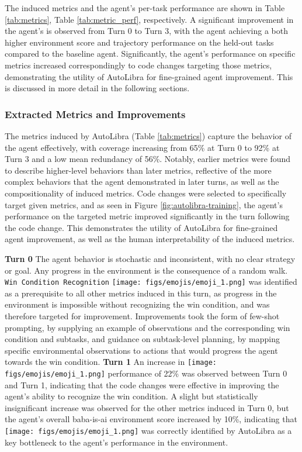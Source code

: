 The induced metrics and the agent's per-task performance are shown in Table \ref{tab:metrics}, Table \ref{tab:metric_perf}, respectively. A significant improvement in the agent's is observed from Turn 0 to Turn 3, with the agent achieving a both higher environment score and trajectory performance on the held-out tasks compared to the baseline agent. Significantly, the agent's performance on specific metrics increased correspondingly to code changes targeting those metrics, demonstrating the utility of AutoLibra for fine-grained agent improvement. This is discussed in more detail in the following sections.

\subsubsection{Extracted Metrics and Improvements}
The metrics induced by AutoLibra (Table \ref{tab:metrics}) capture the behavior of the agent effectively, with coverage increasing from 65\% at Turn 0 to 92\% at Turn 3 and a low mean redundancy of 56\%. Notably, earlier metrics were found to describe higher-level behaviors than later metrics, reflective of the more complex behaviors that the agent demonstrated in later turns, as well as the compositionality of induced metrics. Code changes were selected to specifically target given metrics, and as seen in Figure \ref{fig:autolibra-training}, the agent's performance on the targeted metric improved significantly in the turn following the code change. This demonstrates the utility of AutoLibra for fine-grained agent improvement, as well as the human interpretability of the induced metrics.

\textbf{Turn 0}
The agent behavior is stochastic and inconsistent, with no clear strategy or goal. Any progress in the environment is the consequence of a random walk. 
\texttt{Win Condition Recognition} \texttt{[image: figs/emojis/emoji\_1.png]} was identified as a prerequisite to all other metrics induced in this turn, as progress in the environment is impossible without recognizing the win condition, and was therefore targeted for improvement. Improvements took the form of few-shot prompting, by supplying an example of observations and the corresponding win condition and subtasks, and guidance on subtask-level planning, by mapping specific environmental observations to actions that would progress the agent towards the win condition.
\newline
\textbf{Turn 1}
An increase in \texttt{[image: figs/emojis/emoji\_1.png]} performance of 22\% was observed between Turn 0 and Turn 1, indicating that the code changes were effective in improving the agent's ability to recognize the win condition. A slight but statistically insignificant increase was observed for the other metrics induced in Turn 0, but the agent's overall baba-is-ai environment score increased by 10\%, indicating that \texttt{[image: figs/emojis/emoji\_1.png]} was correctly identified by AutoLibra as a key bottleneck to the agent's performance in the environment.

